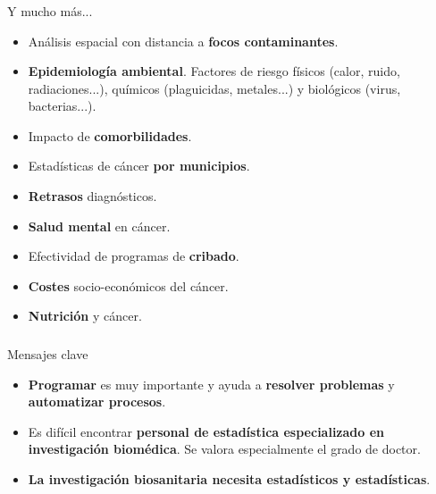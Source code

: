 \documentclass{beamer}
\begin{document}
\begin{frame}\frametitle{}
	\begin{block}{Y mucho más...}
		\begin{itemize}
			\item Análisis espacial con distancia a \textbf{focos contaminantes}.
			\item \textbf{Epidemiología ambiental}. Factores de riesgo físicos (calor, ruido, radiaciones...), químicos (plaguicidas, metales...) y biológicos (virus, bacterias...).
			\item Impacto de \textbf{comorbilidades}.
			\item Estadísticas de cáncer \textbf{por municipios}.
			\item \textbf{Retrasos} diagnósticos.
			\item \textbf{Salud mental} en cáncer.
			\item Efectividad de programas de \textbf{cribado}.
			\item \textbf{Costes} socio-económicos del cáncer.
			\item \textbf{Nutrición} y cáncer.
		\end{itemize}
	\end{block}
\end{frame}


\begin{frame}\frametitle{}
	\begin{block}{Mensajes clave}
		\begin{itemize}
			\item \textbf{Programar} es muy importante y ayuda a \textbf{resolver problemas} y \textbf{automatizar procesos}.\\[2ex]
			\item Es difícil encontrar \textbf{personal de estadística especializado en investigación biomédica}. Se valora especialmente el grado de doctor.\\[2ex]
			\item \textbf{La investigación biosanitaria necesita estadísticos y estadísticas}.\\[2ex]
		\end{itemize}
	\end{block}
\end{frame}

\end{document}

